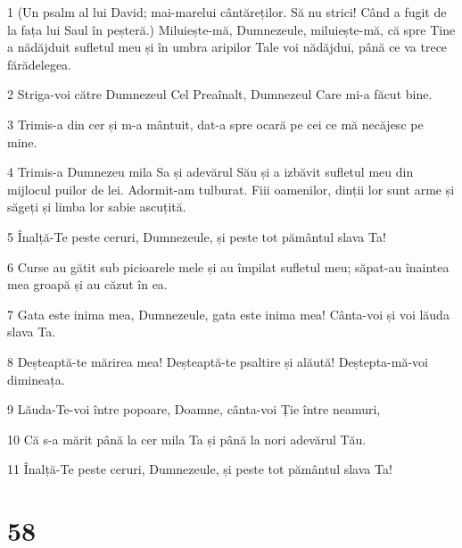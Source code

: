 \par 1 (Un psalm al lui David; mai-marelui cântăreților. Să nu strici! Când a fugit de la fața lui Saul în peșteră.) Miluiește-mă, Dumnezeule, miluiește-mă, că spre Tine a nădăjduit sufletul meu și în umbra aripilor Tale voi nădăjdui, până ce va trece fărădelegea.
\par 2 Striga-voi către Dumnezeul Cel Preaînalt, Dumnezeul Care mi-a făcut bine.
\par 3 Trimis-a din cer și m-a mântuit, dat-a spre ocară pe cei ce mă necăjesc pe mine.
\par 4 Trimis-a Dumnezeu mila Sa și adevărul Său și a izbăvit sufletul meu din mijlocul puilor de lei. Adormit-am tulburat. Fiii oamenilor, dinții lor sunt arme și săgeți și limba lor sabie ascuțită.
\par 5 Înalță-Te peste ceruri, Dumnezeule, și peste tot pământul slava Ta!
\par 6 Curse au gătit sub picioarele mele și au împilat sufletul meu; săpat-au înaintea mea groapă și au căzut în ea.
\par 7 Gata este inima mea, Dumnezeule, gata este inima mea! Cânta-voi și voi lăuda slava Ta.
\par 8 Deșteaptă-te mărirea mea! Deșteaptă-te psaltire și alăută! Deștepta-mă-voi dimineața.
\par 9 Lăuda-Te-voi între popoare, Doamne, cânta-voi Ție între neamuri,
\par 10 Că s-a mărit până la cer mila Ta și până la nori adevărul Tău.
\par 11 Înalță-Te peste ceruri, Dumnezeule, și peste tot pământul slava Ta!

\chapter{58}

